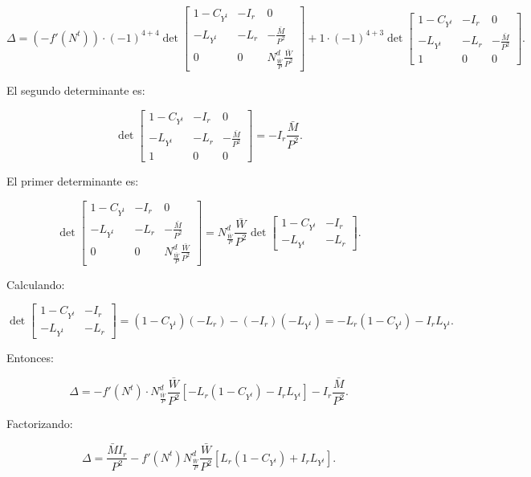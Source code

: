 \documentclass[
  doc,
  floatsintext,
  longtable,
  a4paper,
  nolmodern,
  notxfonts,
  notimes,
  12pt,
  colorlinks=true,linkcolor=blue,citecolor=blue,urlcolor=blue]{apa7}
\begin{document}
\begin{enumerate}
  \[
  \Delta = (-f'(N^t)) \cdot (-1)^{4+4} \det \begin{bmatrix}
  1 - C_{Y^t} & -I_r & 0 \\
  -L_{Y^t} & -L_r & -\frac{\bar{M}}{P^2} \\
  0 & 0 & N^d_{\frac{\bar{W}}{P}} \frac{\bar{W}}{P^2}
  \end{bmatrix}
  + 1 \cdot (-1)^{4+3} \det \begin{bmatrix}
  1 - C_{Y^t} & -I_r & 0 \\
  -L_{Y^t} & -L_r & -\frac{\bar{M}}{P^2} \\
  1 & 0 & 0
  \end{bmatrix}.
  \]

  El segundo determinante es:

  \[
  \det \begin{bmatrix}
  1 - C_{Y^t} & -I_r & 0 \\
  -L_{Y^t} & -L_r & -\frac{\bar{M}}{P^2} \\
  1 & 0 & 0
  \end{bmatrix} = -I_r \frac{\bar{M}}{P^2}.
  \]

  El primer determinante es:

  \[
  \det \begin{bmatrix}
  1 - C_{Y^t} & -I_r & 0 \\
  -L_{Y^t} & -L_r & -\frac{\bar{M}}{P^2} \\
  0 & 0 & N^d_{\frac{\bar{W}}{P}} \frac{\bar{W}}{P^2}
  \end{bmatrix} = N^d_{\frac{\bar{W}}{P}} \frac{\bar{W}}{P^2} \det \begin{bmatrix}
  1 - C_{Y^t} & -I_r \\
  -L_{Y^t} & -L_r
  \end{bmatrix}.
  \]

  Calculando:

  \[
  \det \begin{bmatrix}
  1 - C_{Y^t} & -I_r \\
  -L_{Y^t} & -L_r
  \end{bmatrix} = (1 - C_{Y^t})(-L_r) - (-I_r)(-L_{Y^t}) = -L_r (1 - C_{Y^t}) - I_r L_{Y^t}.
  \]

  Entonces:

  \[
  \Delta = -f'(N^t) \cdot N^d_{\frac{\bar{W}}{P}} \frac{\bar{W}}{P^2} \left[ -L_r (1 - C_{Y^t}) - I_r L_{Y^t} \right] - I_r \frac{\bar{M}}{P^2}.
  \]

  Factorizando:

  \[
  \Delta = \frac{\bar{M} I_r}{P^2} - f'(N^t) N^d_{\frac{\bar{W}}{P}} \frac{\bar{W}}{P^2} \left[ L_r (1 - C_{Y^t}) + I_r L_{Y^t} \right].
  \]


\end{enumerate}
\end{document}
